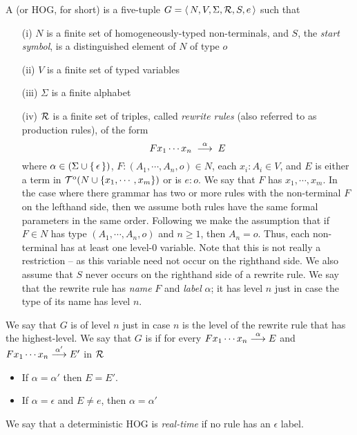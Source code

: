 A  (or HOG, for short) is a
five-tuple $G = \langle\,{N, V, \Sigma, {\cal R}, S, e}\,\rangle$ such that
\begin{itemize}
\item[(i)] $N$ is a finite set of homogeneously-typed
non-terminals, and $S$, the \emph{start symbol}, is a
distinguished element of $N$ of type $o$

\item[(ii)] $V$ is a finite set of typed variables

\item[(iii)] $\Sigma$ is a finite alphabet

\item[(iv)] $\cal R$ is a finite set of triples, called
\emph{rewrite rules} (also referred to as production rules), of
the form
\[F x_1 \cdots x_n \; \stackrel{{\alpha}}{\longrightarrow} \; E\]
where $\alpha \in (\Sigma \cup \{\,{\epsilon}\,\})$, ${F : (A_1,
\cdots, A_n, o)} \in N$, each ${x_i : A_i} \in V$, and $E$ is
either a term in ${\cal T}^o(N \cup \{x_1, \cdots, x_m\})$ or is
$e : o$. We say that $F$ has  $x_1,
\cdots, x_m$. In the case where there grammar has two or more
rules with the non-terminal $F$ on the lefthand side, then we
assume both rules have the same formal parameters in the same
order. Following \cite{KNU01} we make the assumption that if $F
\in N$ has type $(A_1, \cdots, A_n, o)$ and $n \geq 1$, then $A_n
= o$. Thus, each non-terminal has at least one level-$0$ variable.
Note that this is not really a restriction -- as this variable need
not occur on the righthand side. We also assume that $S$ never occurs
on the righthand side of a rewrite rule. We say that the rewrite rule has
\emph{name} $F$ and \emph{label} $\alpha$; it has level $n$ just
in case the type of its name has level $n$.
\end{itemize}
We say that $G$ is of level $n$ just in case $n$ is the level of
the rewrite rule that has the highest-level. We say that $G$ is
 if for every $F x_1 \cdots x_n
\stackrel{{\alpha}}{\longrightarrow} E$ and $F x_1 \cdots x_n \stackrel{{\alpha'}}{\longrightarrow} E'$ in $\cal
R$
\begin{itemize}
\item If $\alpha = \alpha'$ then $E = E'$.

\item If $\alpha = \epsilon$ and $E \not = e$, then $\alpha = \alpha'$
\end{itemize}
We say that a deterministic HOG is \emph{real-time} if no rule has
an $\epsilon$ label.


